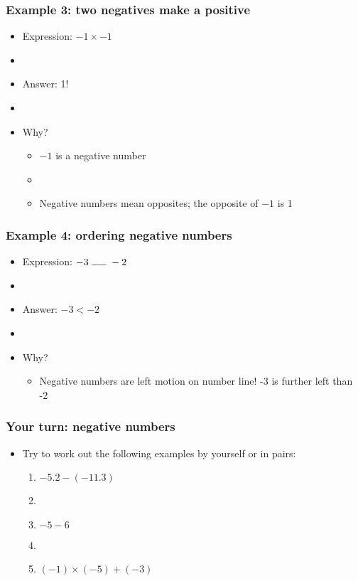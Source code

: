 \documentclass[12pt]{beamer}
\newcommand{\myframe}[1]{\begin{frame} \frametitle{#1}}
\begin{document}
\myframe{Example 3: two negatives make a positive}
\begin{itemize}
\item Expression: $-1 \times -1$
\item[]
\item Answer: 1!
\item[]
\item Why?
\begin{itemize}
\item $-1$ is a negative number
\item[]
\item Negative numbers mean opposites; the opposite of $-1$ is 1
\end{itemize}
\end{itemize}
\end{frame}

\myframe{Example 4: ordering negative numbers}
\begin{itemize}
\item Expression: $-3 \ \rule{.5cm}{0.15mm} \ -2$
\item[]
\item Answer: $-3 < -2$
\item[]
\item Why?
\begin{itemize}
\item Negative numbers are left motion on number line! -3 is further left than -2
\end{itemize}
\end{itemize}
\end{frame}

\myframe{Your turn: negative numbers}
\begin{itemize}
\item Try to work out the following examples by yourself or in pairs:
\begin{enumerate}
\item $-5.2 - (-11.3)$
\item[]
\item $-5 - 6$
\item[]
\item $(-1)\times(-5) + (-3)$
\end{enumerate}
\end{itemize}
\end{frame}
\end{document}
